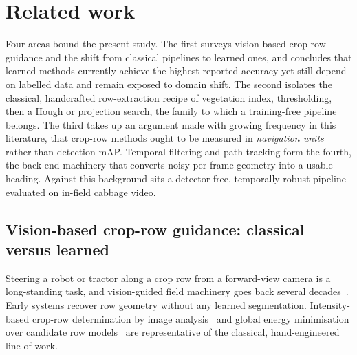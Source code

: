 
\section{Related work}
\label{sec:related}

Four areas bound the present study. The first surveys vision-based crop-row
guidance and the shift from classical pipelines to learned ones, and concludes
that learned methods currently achieve the highest reported accuracy yet still
depend on labelled data and remain exposed to domain shift. The second isolates
the classical, handcrafted row-extraction recipe of vegetation index,
thresholding, then a Hough or projection search, the family to which a
training-free pipeline belongs. The third takes up an argument made with growing
frequency in this literature, that crop-row methods ought to be measured in
\emph{navigation units} rather than detection mAP. Temporal filtering and
path-tracking form the fourth, the back-end machinery that converts noisy
per-frame geometry into a usable heading. Against this background sits a
detector-free, temporally-robust pipeline evaluated on in-field cabbage video.

\subsection{Vision-based crop-row guidance: classical versus learned}
\label{subsec:rw_guidance}
Steering a robot or tractor along a crop row from a forward-view camera is a
long-standing task, and vision-guided field machinery goes back several
decades~\cite{cth6,english2014}. Early systems recover row geometry without any
learned segmentation. Intensity-based crop-row determination by image
analysis~\cite{sogaard} and global energy minimisation over candidate row
models~\cite{crbd} are representative of the classical, hand-engineered line of
work.

